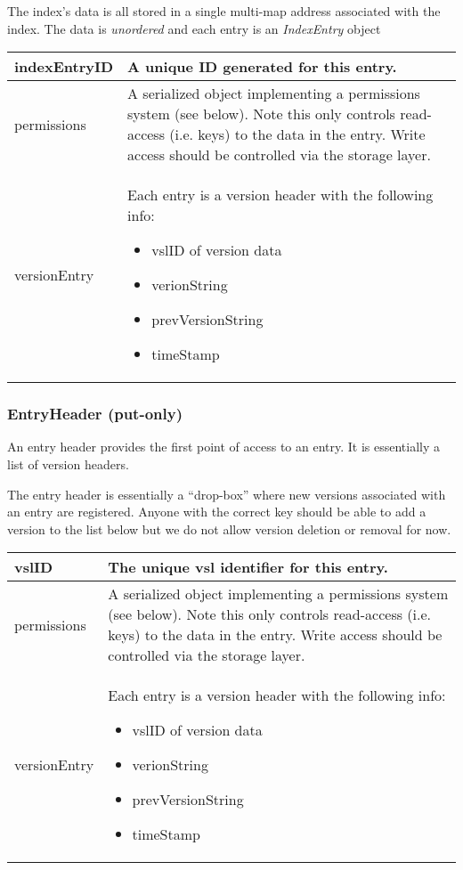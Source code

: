 \documentclass[10pt]{article}
\begin{document}
The index's data is all stored in a single multi-map address associated with the
index.  The data is {\em unordered} and each entry is an {\em IndexEntry} object
\begin{tabular}{|l|p{12cm}|}
\hline
indexEntryID & A unique ID generated for this entry. \\
\hline
permissions & A serialized object implementing a permissions system (see below).
Note this only controls read-access (i.e. keys) to the data in the entry.  Write
access should be controlled via the storage layer. \\
\hline
versionEntry &  Each entry is a version header with the following info:
\begin{itemize}
	\item vslID of version data
	\item verionString 
	\item prevVersionString
	\item timeStamp
\end{itemize}\\
\hline
\end{tabular}


\subsubsection{EntryHeader (put-only)}

An entry header provides the first point of access to an entry.  It is
essentially a list of version headers.

The entry header is essentially a ``drop-box'' where new versions associated
with an entry are registered.  Anyone with the correct key should be able to
add a version to the list below but we do not allow version deletion or removal
for now.


\begin{tabular}{|l|p{12cm}|}
\hline
vslID & The unique vsl identifier for this entry.\\
\hline
permissions & A serialized object implementing a permissions system (see below).
Note this only controls read-access (i.e. keys) to the data in the entry.  Write
access should be controlled via the storage layer. \\
\hline
versionEntry &  Each entry is a version header with the following info:
\begin{itemize}
	\item vslID of version data
	\item verionString 
	\item prevVersionString
	\item timeStamp
\end{itemize}\\
\hline
\end{tabular}
\end{document}
